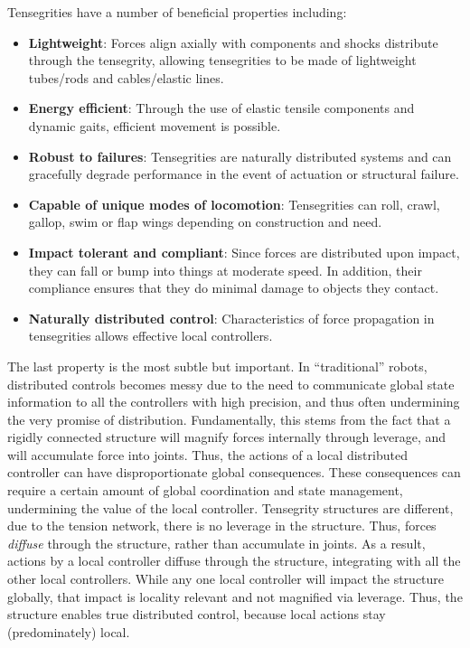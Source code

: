 \documentclass[twocolumn,10pt]{asme2ej}
\begin{document}
 
Tensegrities have a number of beneficial properties including:
\begin{itemize}
\item {\bf Lightweight}: Forces align axially with components and shocks distribute through the tensegrity, allowing tensegrities to be made of lightweight tubes/rods and cables/elastic lines.
\item {\bf Energy efficient}: Through the use of elastic tensile components and dynamic gaits, efficient movement is possible.
\item {\bf Robust to failures}: Tensegrities are naturally distributed systems and can gracefully degrade performance in the event of actuation or structural failure.
\item {\bf Capable of unique modes of locomotion}: Tensegrities can roll, crawl, gallop, swim or flap wings depending on construction and need.
\item {\bf Impact tolerant and compliant}: Since forces are distributed upon impact, they can fall or bump into things at moderate speed. In addition, their compliance ensures that they do minimal damage to objects they contact.
\item {\bf Naturally distributed control}: Characteristics of force propagation in tensegrities allows effective local controllers.
\end{itemize}
The last property is the most subtle but important. In ``traditional'' robots, distributed controls becomes messy due to the need to communicate global state information to all the controllers with high precision, and thus often undermining the very promise of distribution.  Fundamentally, this stems from the fact that a rigidly connected structure will magnify forces internally through leverage, and will accumulate force into joints.  Thus, the actions of a local distributed controller can have disproportionate global consequences. These consequences can require a certain amount of global coordination and state management, undermining the value of the local controller. Tensegrity structures are different, due to the tension network, there is no leverage in the structure.  Thus, forces {\em diffuse} through the structure, rather than accumulate in joints.  As a result, actions by a local controller diffuse through the structure, integrating with all the other local controllers.  While any one local controller will impact the structure globally, that impact is locality relevant and not magnified via leverage. Thus, the structure enables true distributed control, because local actions stay (predominately) local.
\end{document}
